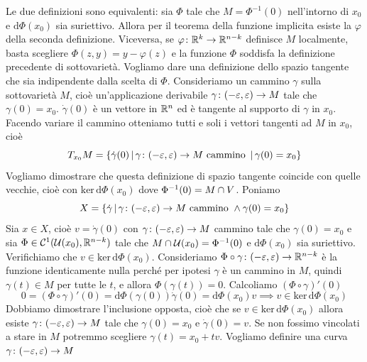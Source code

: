 \documentclass[a4paper]{article}
\begin{document}
Le due definizioni sono equivalenti:
sia \(\Phi\) tale che \(M = \Phi^{-1}(0)\) nell'intorno di \(x_0\) e
\(\text{d}\Phi(x_0)\) sia suriettivo.
Allora per il teorema della funzione implicita esiste la \(\varphi\) della seconda definizione.
Viceversa, se \(\varphi\colon \mathbb{R}^k \to \mathbb{R}^{n-k}\) definisce
\(M\) localmente, basta scegliere \(\Phi(z,y) = y-\varphi(z)\) e la funzione \(\Phi\) soddisfa
la definizione precedente di sottovarietà.
Vogliamo dare una definizione dello spazio tangente che sia indipendente dalla scelta
di \(\Phi\). Consideriamo un cammino \(\gamma\) sulla sottovarietà \(M\), cioè un'applicazione
derivabile \(\gamma \colon (-\varepsilon, \varepsilon) \to M\) tale che \(\gamma(0) = x_0\).
\(\dot{\gamma}(0)\) è un vettore in \(\mathbb{R}^n\) ed è tangente al supporto di \(\gamma\) in \(x_0\).
Facendo variare il cammino otteniamo tutti e soli i vettori tangenti
ad \(M\) in \(x_0\), cioè \[
    T_{x_0}M = \{
        \dot{\gamma}(0) \,|\, \gamma \colon (-\varepsilon, \varepsilon) \to M
        \text{ cammino } \,|\, \gamma(0) = x_0
    \}
\]
Vogliamo dimostrare che questa definizione di spazio tangente coincide con quelle vecchie,
cioè con \(\text{ker}\,\text{d}\Phi(x_0)\) dove \(\Phi^{-1}(0) = M \cap V\).
Poniamo
\[
    X = \{
        \dot{\gamma} \,|\, \gamma \colon (-\varepsilon, \varepsilon) \to M
        \text{ cammino } \land \gamma(0) = x_0
    \}
\]
Sia \(x \in X\), cioè \(v = \dot{\gamma}(0)\) con \(\gamma \colon (-\varepsilon, \varepsilon) \to M\)
cammino tale che \(\gamma(0) = x_0\) e sia
\(\Phi \in \mathcal{C}^1(\mathcal{U}(x_0), \mathbb{R}^{n-k})\) tale che
\(M \cap \mathcal{U}(x_0) = \Phi^{-1}(0)\) e \(\text{d}\Phi(x_0)\) sia suriettivo.
Verifichiamo che \(v \in \text{ker} \, \text{d}\Phi(x_0)\).
Consideriamo \(\Phi \circ \gamma \colon (-\varepsilon, \varepsilon) \to \mathbb{R}^{n-k}\) è la
funzione identicamente nulla perché per ipotesi \(\gamma\) è un cammino in \(M\), quindi
\(\gamma(t) \in M\) per tutte le \(t\), e allora \(\Phi(\gamma(t)) = 0\).
Calcoliamo \((\Phi\circ\gamma)'(0)\)
\[
    0 = (\Phi\circ\gamma)'(0) = \text{d}\Phi(\gamma(0))\dot{\gamma}(0) = \text{d}\Phi(x_0)v
    \implies v \in\text{ker}\,\text{d}\Phi(x_0)
\]
Dobbiamo dimostrare l'inclusione opposta, cioè che se \(v \in \text{ker}\,\text{d}\Phi(x_0)\) 
allora esiste \(\gamma \colon (-\varepsilon, \varepsilon) \to M\) tale che
\(\gamma(0) = x_0\) e \(\dot{\gamma}(0) = v\). Se non fossimo vincolati a stare in \(M\) potremmo
scegliere \(\gamma(t) = x_0 + tv\).
Vogliamo definire una curva \(\gamma \colon (-\varepsilon, \varepsilon) \to M\)
\end{document}
